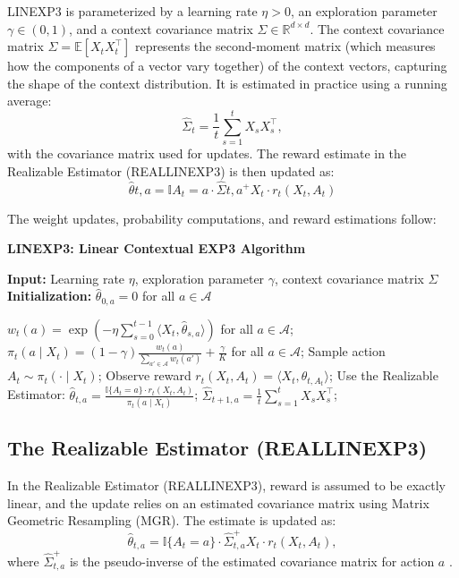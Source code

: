 LINEXP3 is parameterized by a learning rate \(\eta > 0\), an exploration parameter \(\gamma \in (0,1)\), and a context covariance matrix \(\Sigma \in \mathbb{R}^{d \times d}\). The context covariance matrix \(\Sigma = \mathbb{E} [X_t X_t^\top]\) represents the second-moment matrix (which measures how the components of a vector vary together) of the context vectors, capturing the shape of the context distribution. It is estimated in practice using a running average: 
\[
\hat{\Sigma}_t = \frac{1}{t} \sum_{s=1}^t X_s X_s^\top,
\]
with the covariance matrix used for updates. The reward estimate in the Realizable Estimator (REALLINEXP3) is then updated as:
\begin{equation}
\hat{\theta}{t,a} = \mathbb{I}{A_t = a} \cdot \hat{\Sigma}{t,a}^+ X_t \cdot r_t(X_t, A_t)
\label{eq:theta_estimate}
\end{equation}


The weight updates, probability computations, and reward estimations follow:

\begin{algorithm} [H]
\caption{\textbf{LINEXP3: Linear Contextual EXP3 Algorithm}}
\label{alg:LINEXP3}
\textbf{Input:} Learning rate \(\eta\), exploration parameter \(\gamma\), context covariance matrix \(\Sigma\) 
\textbf{Initialization:} \( \hat{\theta}_{0,a} = 0 \) for all \( a \in \mathcal{A} \)
\begin{algorithmic}[1]
    \State \( w_t(a) = \exp\left(-\eta \sum_{s=0}^{t-1} \langle X_t, \hat{\theta}_{s, a} \rangle \right) \) for all \( a \in \mathcal{A} \);
    \State \( \pi_t(a \mid X_t) = (1 - \gamma) \frac{w_t(a)}{\sum_{a' \in \mathcal{A}} w_t(a')} + \frac{\gamma}{K} \) for all \( a \in \mathcal{A} \);
    \State Sample action \( A_t \sim \pi_t(\cdot \mid X_t) \);
    \State Observe reward \( r_t(X_t, A_t) = \langle X_t, \theta_{t, A_t} \rangle \);
        \State Use the Realizable Estimator: \( \hat{\theta}_{t,a} = \frac{\mathbb{I}\{A_t = a\} \cdot r_t(X_t, A_t)}{\pi_t(a \mid X_t)} \);
        \State \( \hat{\Sigma}_{t+1, a} = \frac{1}{t} \sum_{s=1}^t X_s X_s^\top \);
    \EndFor
\EndFor
\end{algorithmic}
\end{algorithm}



\subsection{The Realizable Estimator (REALLINEXP3)}
In the Realizable Estimator (REALLINEXP3), reward is assumed to be exactly linear, and the update relies on an estimated covariance matrix using Matrix Geometric Resampling (MGR). The estimate is updated as:
\[
\hat{\theta}_{t,a} = \mathbb{I}\{A_t = a\} \cdot \hat{\Sigma}_{t,a}^+ X_t \cdot r_t(X_t, A_t) ,
\]
where \(\hat{\Sigma}_{t,a}^+\) is the pseudo-inverse of the estimated covariance matrix for action \(a\) \citep{neu2020linear}.

